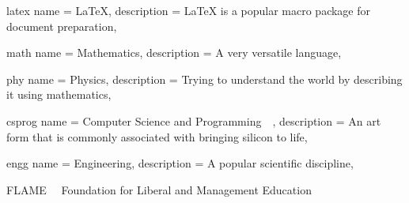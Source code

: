 \newglossaryentry
    {latex}
    {
        name        = {\LaTeX},
        description = {{\LaTeX} is a popular macro package for document preparation},
    }

\newglossaryentry
    {math}
    {
        name        = {Mathematics},
        description = {A very versatile language},
    }

\newglossaryentry
    {phy}
    {
        name        = {Physics},
        description = {Trying to understand the world by describing it using mathematics},
    }

\newglossaryentry
    {csprog}
    {
        name        = {Computer Science and Programming\ \ },
        description = {An art form that is commonly associated with bringing silicon to life},
    }

\newglossaryentry
    {engg}
    {
        name        = {Engineering},
        description = {A popular scientific discipline},
    }

 {FLAME\ \ } {Foundation for Liberal and Management Education}
